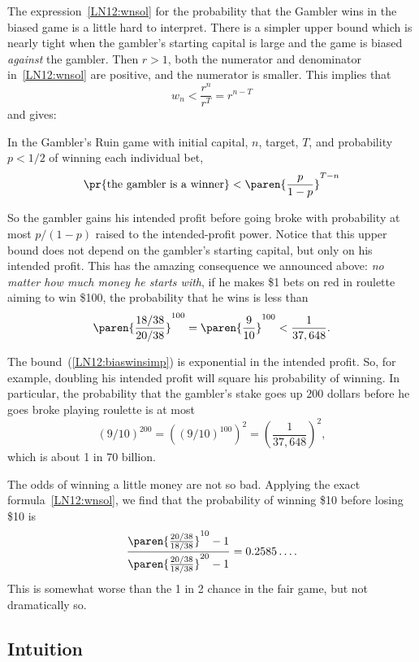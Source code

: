 The expression~\eqref{LN12:wnsol} for the probability that the Gambler
wins in the biased game is a little hard to interpret.  There is a
simpler upper bound which is nearly tight when the gambler's starting
capital is large and the game is biased {\em against} the gambler.
Then $r >1$, both the numerator and denominator
in~\eqref{LN12:wnsol} are positive, and the numerator is smaller.
This implies that
\[
w_n < \frac{r^n}{r^T} = r^{n-T}
\]
and gives:
\begin{corollary}\label{LN12:biaswincor}
  In the Gambler's Ruin game with initial capital, $n$, target, $T$,
  and probability $p < 1/2$ of winning each individual bet,
\begin{equation}\label{LN12:biaswinsimp}
\pr{\text{the gambler is a winner}} < \paren{\frac{p}{1-p}}^{T-n}
\end{equation}
\end{corollary}

So the gambler gains his intended profit before going broke with
probability at most $p/(1-p)$ raised to the intended-profit power.
Notice that this upper bound does not depend on the gambler's starting
capital, but only on his intended profit.  This has the amazing
consequence we announced above: \emph{no matter how much money he
  starts with}, if he makes \$1 bets on red in roulette aiming to win
\$100, the probability that he wins is less than
\[
\paren{\frac{18/38}{20/38}}^{100} = \paren{\frac{9}{10}}^{100} < \frac{1}{37,648}.
\]

The bound~(\ref{LN12:biaswinsimp}) is exponential in the intended profit.  So,
for example, doubling his intended profit will square his probability of
winning.  In particular, the probability that the gambler's stake goes up
$200$ dollars before he goes broke playing roulette is at most
\[
(9/10)^{200} = ((9/10)^{100})^2 = \left(\frac{1}{37,648}\right)^2,
\]
which is about 1 in 70 billion.

\begin{editingnotes}

The odds of winning a little money are not so bad.
Applying the exact formula~\eqref{LN12:wnsol}, we find that the probability
of winning \$10 before losing \$10 is
\[
\frac{\paren{\frac{20/38}{18/38}}^{10} - 1}
              {\paren{\frac{20/38}{18/38}}^{20} - 1}
  = 0.2585\dots.
\]
This is somewhat worse than the 1 in 2 chance in the fair game, but not
dramatically so.

\end{editingnotes}

\subsection{Intuition}

